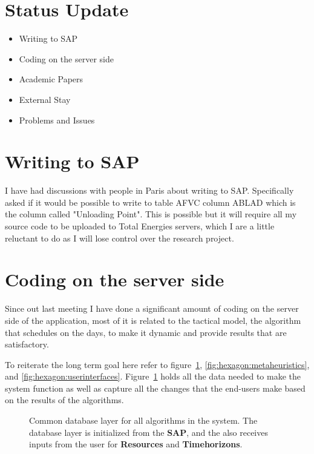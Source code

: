 \section{Status Update}

\begin{itemize}
	\item Writing to SAP
	\item Coding on the server side
	\item Academic Papers
	\item External Stay
	\item Problems and Issues
\end{itemize}

\section{Writing to SAP}
I have had discussions with people in Paris about writing to SAP. Specifically 
asked if it would be possible to write to table AFVC column ABLAD which is the 
column called "Unloading Point". This is possible but it will require all
my source code to be uploaded to Total Energies servers, which I are a little 
reluctant to do as I will lose control over the research project.

\section{Coding on the server side}
Since out last meeting I have done a significant amount of coding on the server side
of the application, most of it is related to the tactical model, the algorithm that schedules
on the days, to make it dynamic and provide results that are satisfactory.

To reiterate the long term goal here refer to figure~\ref{fig:hexagon:persistence}, \ref{fig:hexagon:metaheuristics}, and \ref{fig:hexagon:userinterfaces}.
Figure~\ref{fig:hexagon:persistence} holds all the data
needed to make the system function as well as capture all the changes that the end-users make based on the results of the algorithms.


\begin{figure}[H]
	\centering
    \drawModelSetupHexagon[userinterface=false, persistence=true, metaheuristics=false]
	\caption{Common database layer for all algorithms in the system. The database layer is initialized from
	the \textbf{SAP}, and the also receives inputs from the user for \textbf{Resources} and \textbf{Timehorizons}.}
	\label{fig:hexagon:persistence}
\end{figure}

